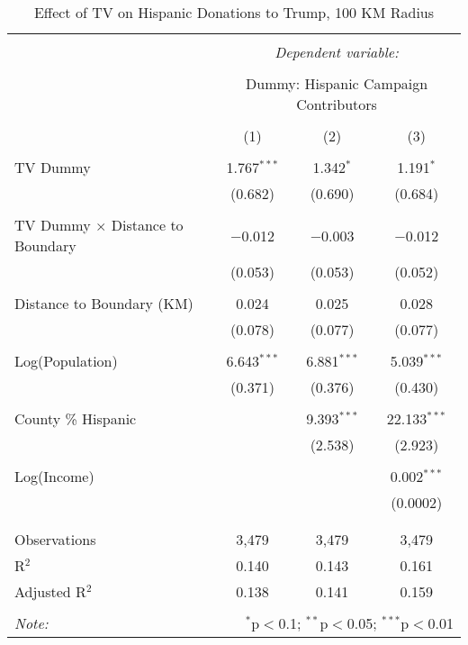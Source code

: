 
\begin{table}[!htbp] \centering 
  \caption{Effect of TV on Hispanic Donations to Trump, 100 KM Radius} 
  \label{} 
\begin{tabular}{@{\extracolsep{-5pt}}lccc} 
\\[-1.8ex]\hline 
\hline \\[-1.8ex] 
 & \multicolumn{3}{c}{\textit{Dependent variable:}} \\ 
\cline{2-4} 
\\[-1.8ex] & \multicolumn{3}{c}{Dummy: Hispanic Campaign Contributors} \\ 
\\[-1.8ex] & (1) & (2) & (3)\\ 
\hline \\[-1.8ex] 
 TV Dummy & 1.767$^{***}$ & 1.342$^{*}$ & 1.191$^{*}$ \\ 
  & (0.682) & (0.690) & (0.684) \\ 
  & & & \\ 
 TV Dummy $\times$ Distance to Boundary  & $-$0.012 & $-$0.003 & $-$0.012 \\ 
  & (0.053) & (0.053) & (0.052) \\ 
  & & & \\ 
 Distance to Boundary (KM) & 0.024 & 0.025 & 0.028 \\ 
  & (0.078) & (0.077) & (0.077) \\ 
  & & & \\ 
 Log(Population) & 6.643$^{***}$ & 6.881$^{***}$ & 5.039$^{***}$ \\ 
  & (0.371) & (0.376) & (0.430) \\ 
  & & & \\ 
 County \% Hispanic &  & 9.393$^{***}$ & 22.133$^{***}$ \\ 
  &  & (2.538) & (2.923) \\ 
  & & & \\ 
 Log(Income) &  &  & 0.002$^{***}$ \\ 
  &  &  & (0.0002) \\ 
  & & & \\ 
\hline \\[-1.8ex] 
Observations & 3,479 & 3,479 & 3,479 \\ 
R$^{2}$ & 0.140 & 0.143 & 0.161 \\ 
Adjusted R$^{2}$ & 0.138 & 0.141 & 0.159 \\ 
\hline 
\hline \\[-1.8ex] 
\textit{Note:}  & \multicolumn{3}{r}{$^{*}$p$<$0.1; $^{**}$p$<$0.05; $^{***}$p$<$0.01} \\ 
\end{tabular} 
\end{table} 
